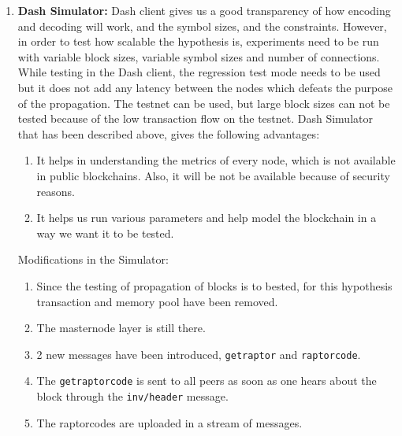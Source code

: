 \begin{enumerate}
    \item \textbf{Dash Simulator:}
        Dash client gives us a good transparency of how encoding and decoding will work,
        and the symbol sizes, and the constraints. However, in order to test how
        scalable the hypothesis is, experiments need to be run with variable
        block sizes, variable symbol sizes and number of connections. While
        testing in the Dash client, the regression test mode needs to be used
        but it does not add any latency between the nodes which defeats the
        purpose of the propagation. The testnet can be used, but large block
        sizes can not be tested because of the low transaction flow on the
        testnet. Dash Simulator that has been described above, gives the
        following advantages:

        \begin{enumerate}
            \item It helps in understanding the metrics of every node, which is
                not available in public blockchains. Also, it will be not be
                available because of security reasons.
            \item It helps us run various parameters and help model the
                blockchain in a way we want it to be tested.
        \end{enumerate}

        Modifications in the Simulator:
        \begin{enumerate}
            \item Since the testing of propagation of blocks is to bested, for
                this hypothesis transaction and memory pool have been removed.
            \item The masternode layer is still there. 
            \item 2 new messages have been introduced, \texttt{getraptor} and \texttt{raptorcode}.
            \item The \texttt{getraptorcode} is sent to all peers as soon as one hears
                about the block through the \texttt{inv/header} message.
            \item The raptorcodes are uploaded in a stream of messages.
        \end{enumerate}
\end{enumerate}



